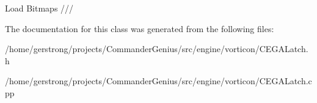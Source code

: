 Load Bitmaps ///



The documentation for this class was generated from the following files:\begin{DoxyCompactItemize}
\item 
/home/gerstrong/projects/CommanderGenius/src/engine/vorticon/CEGALatch.h\item 
/home/gerstrong/projects/CommanderGenius/src/engine/vorticon/CEGALatch.cpp\end{DoxyCompactItemize}
